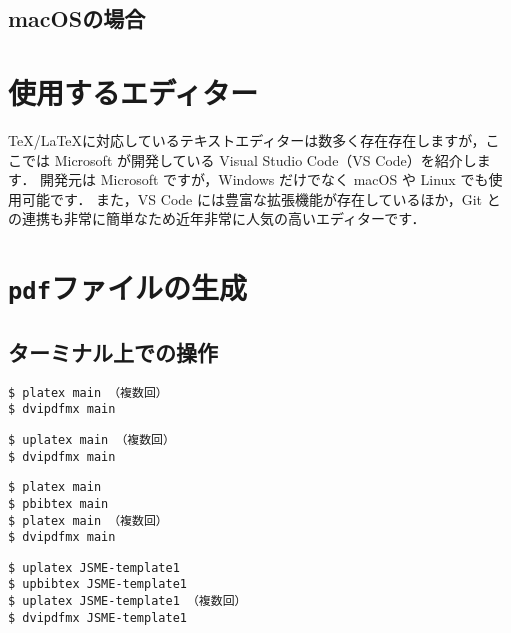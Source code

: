 \subsection{macOSの場合}
\label{ssec:mac}



\section{使用するエディター}
\label{sec:editor}

\TeX/\LaTeX に対応しているテキストエディターは数多く存在存在しますが，ここでは Microsoft が開発している Visual Studio Code（VS Code）を紹介します．
開発元は Microsoft ですが，Windows だけでなく macOS や Linux でも使用可能です．
また，VS Code には豊富な拡張機能が存在しているほか，Git との連携も非常に簡単なため近年非常に人気の高いエディターです．

\section{\texttt{pdf}ファイルの生成}
\label{sec:makepdf}

\subsection{ターミナル上での操作}
\label{ssec:terminal}

\begin{tcolorbox}[enhanced, title=\pLaTeX, drop fuzzy shadow]
\begin{verbatim}
$ platex main （複数回）
$ dvipdfmx main
\end{verbatim}
\end{tcolorbox}


\begin{tcolorbox}[enhanced, title=\upLaTeX, drop fuzzy shadow]
\begin{verbatim}
$ uplatex main （複数回）
$ dvipdfmx main
\end{verbatim}
\end{tcolorbox}


\begin{tcolorbox}[enhanced, title=\pLaTeX$+$\pBibTeX, drop fuzzy shadow]
\begin{verbatim}
$ platex main
$ pbibtex main
$ platex main （複数回）
$ dvipdfmx main
\end{verbatim}
\end{tcolorbox}


\begin{tcolorbox}[enhanced, title=\upLaTeX$+$\upBibTeX, drop fuzzy shadow]
\begin{verbatim}
$ uplatex JSME-template1
$ upbibtex JSME-template1
$ uplatex JSME-template1 （複数回）
$ dvipdfmx JSME-template1
\end{verbatim}
\end{tcolorbox}

